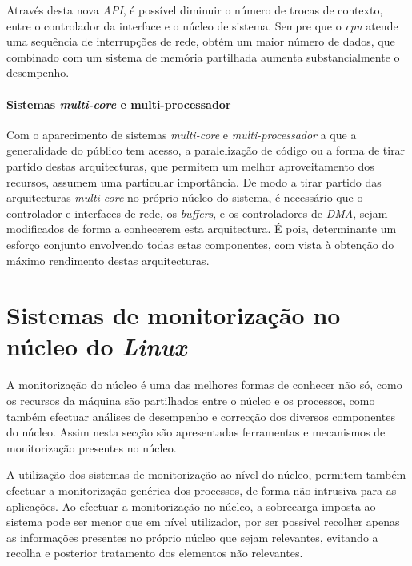 Através desta nova \textit{API}, é possível diminuir o número de trocas de contexto, entre o controlador da interface e o núcleo de sistema.
Sempre que o \textit{cpu} atende uma sequência de interrupções de rede, obtém um maior número de dados, que combinado com um sistema de memória partilhada aumenta substancialmente o desempenho.

\paragraph*{Sistemas \textit{multi-core} e multi-processador}

Com o aparecimento de sistemas \textit{multi-core} e \textit{multi-processador} a que a generalidade do público tem acesso, a paralelização de código ou a forma de tirar partido destas arquitecturas, que permitem um melhor aproveitamento dos recursos, assumem uma particular importância.
De modo a tirar partido das arquitecturas \textit{multi-core} no próprio núcleo do sistema, é necessário que o controlador e interfaces de rede, os \textit{buffers}, e os controladores de \textit{DMA}, sejam modificados de forma a conhecerem esta arquitectura.
É pois, determinante um esforço conjunto envolvendo todas estas componentes, com vista à obtenção do máximo rendimento destas arquitecturas\cite{Deri:2010}.



\section{Sistemas de monitorização no núcleo do \textit{Linux}}\label{sect:instrumentacao_casos_linux}

A monitorização do núcleo é uma das melhores formas de conhecer não só, como os recursos da máquina são partilhados entre o núcleo e os processos, como também efectuar análises de desempenho e correcção dos diversos componentes do núcleo.
Assim nesta secção são apresentadas ferramentas e mecanismos de monitorização presentes no núcleo.

A utilização dos sistemas de monitorização ao nível do núcleo, permitem também efectuar a monitorização genérica dos processos, de forma não intrusiva para as aplicações.
Ao efectuar a monitorização no núcleo, a sobrecarga imposta ao sistema pode ser menor que em nível utilizador, por ser possível recolher apenas as informações presentes no próprio núcleo que sejam relevantes, evitando a recolha e posterior tratamento dos elementos não relevantes.

